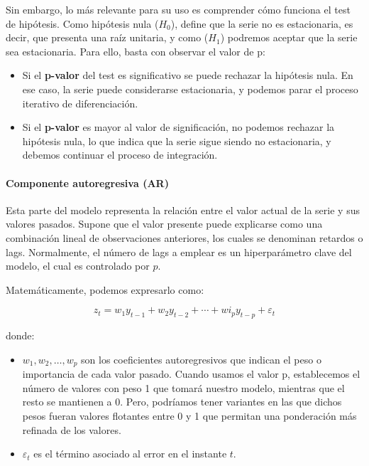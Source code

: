 \begin{itemize}
	Sin embargo, lo más relevante para su uso es comprender cómo funciona el test de hipótesis. Como hipótesis nula (\( H_0 \)), define que la serie no es estacionaria, es decir, que presenta una raíz unitaria, y como (\( H_1 \)) podremos aceptar que la serie sea estacionaria. Para ello, basta con observar el valor de p:
	
	\begin{itemize}
		\item Si el \textbf{p-valor} del test es significativo se puede rechazar la hipótesis nula. En ese caso, la serie puede considerarse estacionaria, y podemos parar el proceso iterativo de diferenciación.
		\item Si el \textbf{p-valor} es mayor al valor de significación, no podemos rechazar la hipótesis nula, lo que indica que la serie sigue siendo no estacionaria, y debemos continuar el proceso de integración.
	\end{itemize}
	
\end{itemize}


\paragraph{Componente autoregresiva (AR)}
\mbox{}

Esta parte del modelo representa la relación entre el valor actual de la serie y sus valores pasados. Supone que el valor presente puede explicarse como una combinación lineal de observaciones anteriores, los cuales se denominan retardos o lags. Normalmente, el número de lags a emplear es un hiperparámetro clave del modelo, el cual es controlado por  \( p \).

	Matemáticamente, podemos expresarlo como:
	
	\[
	z_t = w_1 y_{t-1} + w_2 y_{t-2} + \cdots + wi_p y_{t-p} + \varepsilon_t
	\]
	
	donde:
	\begin{itemize}
		\item \( w_1, w_2, \ldots, w_p \) son los coeficientes autoregresivos que indican el peso o importancia de cada valor pasado. Cuando usamos el valor p, establecemos el número de valores con peso 1 que tomará nuestro modelo, mientras que el resto se mantienen a 0.  Pero, podríamos tener variantes en las que dichos pesos fueran valores flotantes entre 0 y 1 que permitan una ponderación más refinada de los valores.
		\item \( \varepsilon_t \) es el término asociado al error en el instante \( t \).
	\end{itemize}
	
